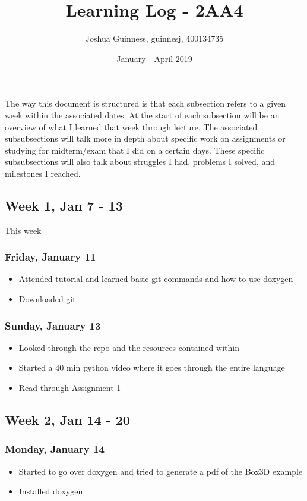 \documentclass{article}
\title{Learning Log - 2AA4}
\author{Joshua Guinness, guinnesj, 400134735}
\date{January - April 2019}
\begin{document}
\maketitle

The way this document is structured is that each subsection refers to a given week within the associated dates. At the start of each subsection will be an overview of what I learned that week through lecture. The associated subsubsections will talk more in depth about specific work on assignments or studying for midterm/exam that I did on a certain days. These specific subsubsections will also talk about struggles I had, problems I solved, and milestones I reached.

\subsection{Week 1, Jan 7 - 13}

This week 

\subsubsection{Friday, January 11}
\begin{itemize}
    \item Attended tutorial and learned basic git commands and how to use doxygen
    \item Downloaded git
\end{itemize}

\subsubsection{Sunday, January 13}
\begin{itemize}
    \item Looked through the repo and the resources contained within
    \item Started a 40 min python video where it goes through the entire language
    \item Read through Assignment 1
\end{itemize}

\subsection{Week 2, Jan 14 - 20}

\subsubsection{Monday, January 14}
\begin{itemize}
    \item Started to go over doxygen and tried to generate a pdf of the Box3D example
    \item Installed doxygen
\end{itemize}
\end{document}
